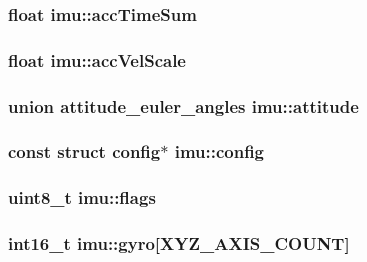 \hypertarget{structimu_a6f6a85c2739a8a912f5fd8988a0a584d}{
\subsubsection[{acc\+Time\+Sum}]{\setlength{\rightskip}{0pt plus 5cm}float imu\+::acc\+Time\+Sum}}\label{structimu_a6f6a85c2739a8a912f5fd8988a0a584d}
\hypertarget{structimu_a6f515bf6ae1ada05c4a5a1ac646d5d37}{
\subsubsection[{acc\+Vel\+Scale}]{\setlength{\rightskip}{0pt plus 5cm}float imu\+::acc\+Vel\+Scale}}\label{structimu_a6f515bf6ae1ada05c4a5a1ac646d5d37}
\hypertarget{structimu_a1be9fe63a9d487faab37addb481aae63}{
\subsubsection[{attitude}]{\setlength{\rightskip}{0pt plus 5cm}union {\bf attitude\+\_\+euler\+\_\+angles} imu\+::attitude}}\label{structimu_a1be9fe63a9d487faab37addb481aae63}
\hypertarget{structimu_a284b22d9660acd784758eb89c406a1db}{
\subsubsection[{config}]{\setlength{\rightskip}{0pt plus 5cm}const struct {\bf config}$\ast$ imu\+::config}}\label{structimu_a284b22d9660acd784758eb89c406a1db}
\hypertarget{structimu_a56ba1722e4c7532cf8abdb8609409ed9}{
\subsubsection[{flags}]{\setlength{\rightskip}{0pt plus 5cm}uint8\+\_\+t imu\+::flags}}\label{structimu_a56ba1722e4c7532cf8abdb8609409ed9}
\hypertarget{structimu_ac019d6da4c291b43dd8084e0f06db086}{
\subsubsection[{gyro}]{\setlength{\rightskip}{0pt plus 5cm}int16\+\_\+t imu\+::gyro\mbox{[}{\bf X\+Y\+Z\+\_\+\+A\+X\+I\+S\+\_\+\+C\+O\+U\+N\+T}\mbox{]}}}\label{structimu_ac019d6da4c291b43dd8084e0f06db086}
